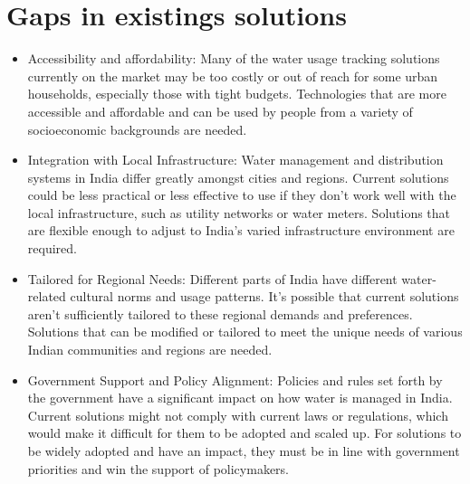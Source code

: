 \section{Gaps in existings solutions}
\begin{itemize}
	\item Accessibility and affordability: Many of the water usage tracking solutions currently on the market may be too costly or out of reach for some urban households, especially those with tight budgets. Technologies that are more accessible and affordable and can be used by people from a variety of socioeconomic backgrounds are needed.
	\item Integration with Local Infrastructure: Water management and distribution systems in India differ greatly amongst cities and regions. Current solutions could be less practical or less effective to use if they don't work well with the local infrastructure, such as utility networks or water meters. Solutions that are flexible enough to adjust to India's varied infrastructure environment are required.
	\item Tailored for Regional Needs: Different parts of India have different water-related cultural norms and usage patterns. It's possible that current solutions aren't sufficiently tailored to these regional demands and preferences. Solutions that can be modified or tailored to meet the unique needs of various Indian communities and regions are needed.
	\item Government Support and Policy Alignment: Policies and rules set forth by the government have a significant impact on how water is managed in India. Current solutions might not comply with current laws or regulations, which would make it difficult for them to be adopted and scaled up. For solutions to be widely adopted and have an impact, they must be in line with government priorities and win the support of policymakers.
	
\end{itemize}

